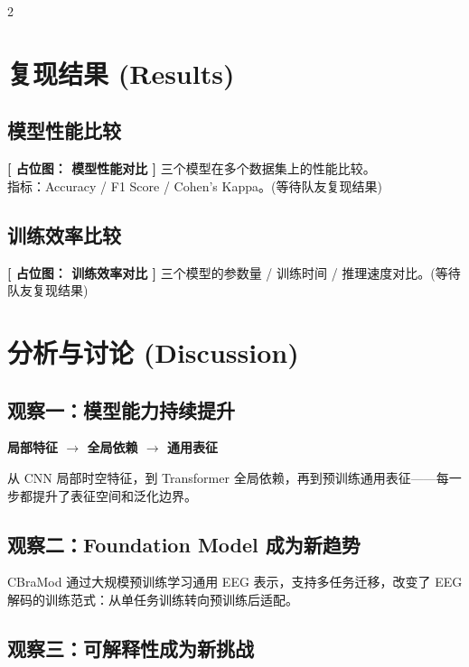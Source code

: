 \documentclass[12pt, a0paper]{article}
\renewcommand{\large}{\fontsize{26}{34}\selectfont}
\renewcommand{\Large}{\fontsize{30}{38}\selectfont}
\renewcommand{\small}{\fontsize{16}{22}\selectfont}
\newcommand{\placeholderh}[3]{%
    \begin{center}
    \colorbox{mygray!12}{\parbox{0.9\columnwidth}{%
        \centering
        \vspace{1.2em}
        {\Large\bfseries\color{mygray} [ 占位图： #1 ]}
        \vspace{0.8em}
        {\small\color{mygray} #2}
        \vspace{#3}
    }}
    \end{center}
}
\begin{document}
\begin{multicols}{2}
\section{复现结果 (Results)}

\subsection{模型性能比较}

\placeholderh{模型性能对比}{%
    三个模型在多个数据集上的性能比较。\\
    指标：Accuracy / F1 Score / Cohen's Kappa。\quad (等待队友复现结果)}{7cm}

\subsection{训练效率比较}

\placeholderh{训练效率对比}{%
    三个模型的参数量 / 训练时间 / 推理速度对比。\quad (等待队友复现结果)}{5cm}

\section{分析与讨论 (Discussion)}

\subsection{观察一：模型能力持续提升}

\begin{center}
\large\bfseries
局部特征 \quad $\longrightarrow$ \quad 全局依赖 \quad $\longrightarrow$ \quad 通用表征
\end{center}

从 CNN 局部时空特征，到 Transformer 全局依赖，再到预训练通用表征——每一步都提升了表征空间和泛化边界。

\subsection{观察二：Foundation Model 成为新趋势}

CBraMod 通过大规模预训练学习通用 EEG 表示，支持多任务迁移，改变了 EEG 解码的训练范式：从单任务训练转向预训练后适配。

\subsection{观察三：可解释性成为新挑战}


\end{multicols}
\end{document}
